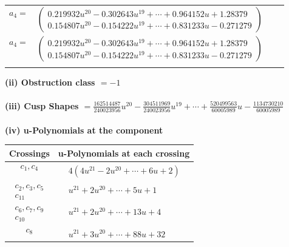 \documentclass[1p]{elsarticle_modified}
\theoremstyle{definition}
\begin{document}
\begin{tabular}{m{7pt} m{180pt} m{7pt} m{180pt} }
\flushright $a_{4}=$&$\begin{pmatrix}0.219932 u^{20}-0.302643 u^{19}+\cdots+0.964152 u+1.28379\\0.154807 u^{20}-0.154222 u^{19}+\cdots+0.831233 u-0.271279\end{pmatrix}$\\ \flushright $a_{4}=$&$\begin{pmatrix}0.219932 u^{20}-0.302643 u^{19}+\cdots+0.964152 u+1.28379\\0.154807 u^{20}-0.154222 u^{19}+\cdots+0.831233 u-0.271279\end{pmatrix}$\\&\end{tabular}
\flushleft \textbf{(ii) Obstruction class $= -1$}\\~\\
\flushleft \textbf{(iii) Cusp Shapes $= \frac{162514487}{240023956} u^{20}-\frac{304511969}{240023956} u^{19}+\cdots+\frac{520499563}{60005989} u-\frac{1134730210}{60005989}$}\\~\\
\newpage\renewcommand{\arraystretch}{1}
\flushleft \textbf{(iv) u-Polynomials at the component}\newline \\
\begin{tabular}{m{50pt}|m{274pt}}
Crossings & \hspace{64pt}u-Polynomials at each crossing \\
\hline $$\begin{aligned}c_{1},c_{4}\end{aligned}$$&$\begin{aligned}
&4(4 u^{21}-2 u^{20}+\cdots+6 u+2)
\end{aligned}$\\
\hline $$\begin{aligned}c_{2},c_{3},c_{5}\\c_{11}\end{aligned}$$&$\begin{aligned}
&u^{21}+2 u^{20}+\cdots+5 u+1
\end{aligned}$\\
\hline $$\begin{aligned}c_{6},c_{7},c_{9}\\c_{10}\end{aligned}$$&$\begin{aligned}
&u^{21}+2 u^{20}+\cdots+13 u+4
\end{aligned}$\\
\hline $$\begin{aligned}c_{8}\end{aligned}$$&$\begin{aligned}
&u^{21}+3 u^{20}+\cdots+88 u+32
\end{aligned}$\\
\hline
\end{tabular}\\~\\
\end{document}
